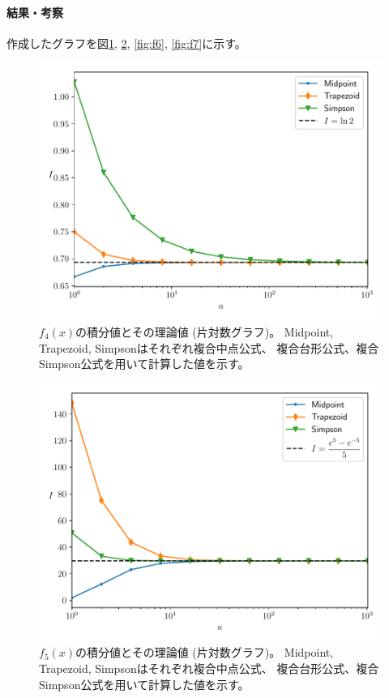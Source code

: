 \documentclass[a4j, titlepage]{jsarticle}
\numberwithin{equation}{section}
\begin{document}
            \paragraph{結果・考察}
                作成したグラフを図\ref{fig:f4}, \ref{fig:f5}, \ref{fig:f6}, \ref{fig:f7}に示す。
                \begin{figure}[h]
                    \centering
                    \includegraphics[width=0.8\hsize]{kadai2/2/f4.pdf}
                    \caption{
                        $f_4(x)$の積分値とその理論値 (片対数グラフ)。
                        Midpoint, Trapezoid, Simpsonはそれぞれ複合中点公式、
                        複合台形公式、複合Simpson公式を用いて計算した値を示す。
                    }
                    \label{fig:f4}
                \end{figure}
                \begin{figure}[h]
                    \centering
                    \includegraphics[width=0.8\hsize]{kadai2/2/f5.pdf}
                    \caption{
                        $f_5(x)$の積分値とその理論値 (片対数グラフ)。
                        Midpoint, Trapezoid, Simpsonはそれぞれ複合中点公式、
                        複合台形公式、複合Simpson公式を用いて計算した値を示す。
                    }
                    \label{fig:f5}
                \end{figure}
\end{document}
